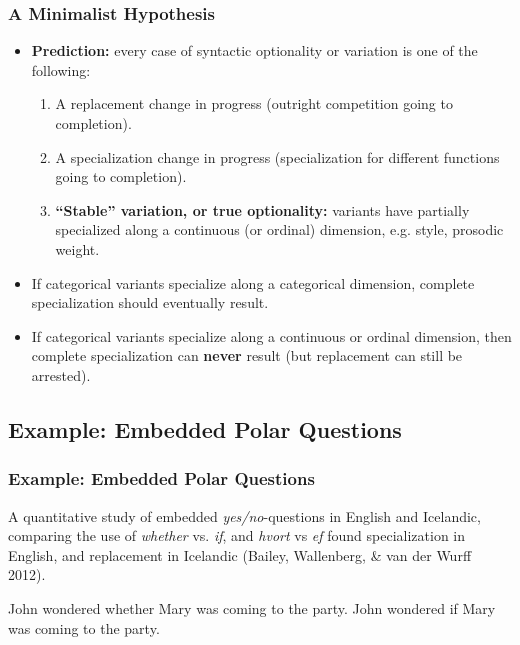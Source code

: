 \documentclass[hyperref={pdfpagelabels=false}]{beamer}
\begin{document}
\begin{frame}
\frametitle{A Minimalist Hypothesis}
\begin{itemize}
	\item \textbf{Prediction:} every case of syntactic optionality or variation is one of the following:
		\begin{enumerate}
			\item A replacement change in progress (outright competition going to completion).
			\item A specialization change in progress (specialization for different functions going to completion).
			\item \textbf{``Stable'' variation, or true optionality:} variants have partially specialized along a continuous (or ordinal) dimension, e.g. style, prosodic weight. 
		\end{enumerate}
	\item If categorical variants specialize along a categorical dimension, complete specialization should eventually result.
	\item If categorical variants specialize along a continuous or ordinal dimension, then complete specialization can \textbf{never} result (but replacement can still be arrested).
\end{itemize}

\end{frame}

\subsection{Example: Embedded Polar Questions}

\begin{frame}
\frametitle{Example: Embedded Polar Questions}
A quantitative study of embedded \textsl{yes/no}-questions in English and Icelandic, comparing the use of \textsl{whether} vs. \textsl{if}, and \textsl{hvort} vs \textsl{ef} found specialization in English, and replacement in Icelandic (Bailey, Wallenberg, \& van der Wurff 2012). \nocite{baileywallenbergwurff2012}\\
	\begin{exe}
		\ex John wondered whether Mary was coming to the party.
		\ex John wondered if Mary was coming to the party.
	\end{exe}
\end{frame}
\end{document}
